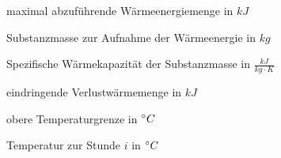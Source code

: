 \begin{description}[\dth]

	\item[$\emax$] maximal abzuf\"uhrende W\"armeenergiemenge in $kJ$
	\item[$m$] Substanzmasse zur Aufnahme der Wärmeenergie in $kg$
	\item[$c$] Spezifische Wärmekapazität der Substanzmasse in $\frac{kJ}{kg
		\cdot K}$
	\item[$Q_v$] eindringende Verlustwärmemenge in $kJ$
	\item[$t_{min}$] obere Temperaturgrenze in $ ^\circ C $
	\item[$t(i)$] Temperatur zur Stunde $i$ in $ ^\circ C $

\end{description}
\vspace{0.5cm}
